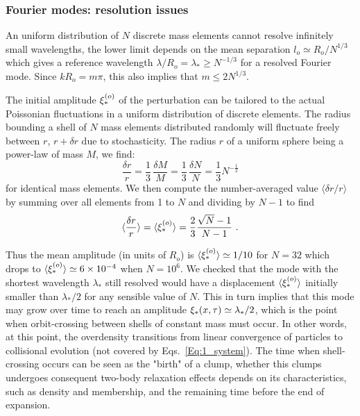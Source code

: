\subsubsection{Fourier modes: resolution issues} 
\label{Ssub:1_FourierModes}
An uniform distribution of $N$ discrete mass elements cannot resolve infinitely small wavelengths, the lower limit depends on the mean separation $l_o\simeq R_o / N^{1/3}$ which gives a reference wavelength $\lambda / R_o = \lambda_\ast \ge N^{-1/3}$ for a resolved  Fourier mode. 
Since $kR_o = m\pi$, this also implies that $ m \le 2 N^{1/3}$.  

The initial amplitude $\xi_\ast^{(o)}$  of the perturbation can be tailored to the actual Poissonian fluctuations in a uniform distribution of discrete elements. The radius bounding a shell of $N$ mass elements distributed randomly will fluctuate freely between $r$, $r + \delta r$ due to stochasticity. The radius $r$ of a uniform sphere being a power-law of mass $M$, we 
find:
\begin{equation}
\frac{\delta r}{r} = \frac{1}{3}\,\frac{\delta M}{M} =  \frac{1}{3}\,\frac{\delta N}{N} = \frac{1}{3} N^{-\frac{1}{2}}
\end{equation}
 for identical mass elements. We then compute the number-averaged value $\langle \delta r/r\rangle$ by summing over  all elements from 1 to $N$ and dividing by $N-1$ to find 
\begin{equation}
\langle \frac{\delta r}{r} \rangle = \langle \xistaro\rangle = \frac{2}{3} \frac{\sqrt{N} - 1 }{N - 1} \ .
\end{equation}  

Thus the mean amplitude (in units of $R_o$) is $\langle\xi_\ast^{(o)}\rangle\simeq 1/10$ for $N=32$ which drops to $\langle\xi_\ast^{(o)}\rangle\simeq 6\times 10^{-4}$ when $N = 10^6$. We checked that the mode with the shortest wavelength $\lambda_\ast$ still resolved would have a displacement $\langle\xi_\ast^{(o)}\rangle$ initially 
smaller than $\lambda_\ast/2$ for any sensible value of $N$. This in turn implies that this mode may grow over time to reach an amplitude $\xi_\ast(x,\tau) \simeq \lambda_\ast/2$, which is the point when orbit-crossing between shells of constant mass must occur. In other words, at this point, the overdensity transitions from linear convergence of particles to  collisional evolution (not covered by Eqs.~\ref{Eq:1_system}). The time when shell-crossing occurs can be seen as the "birth" of a clump, whether this clumps undergoes consequent two-body relaxation effects depends on its characteristics, such as density and membership, and the remaining time before the end of expansion. 

